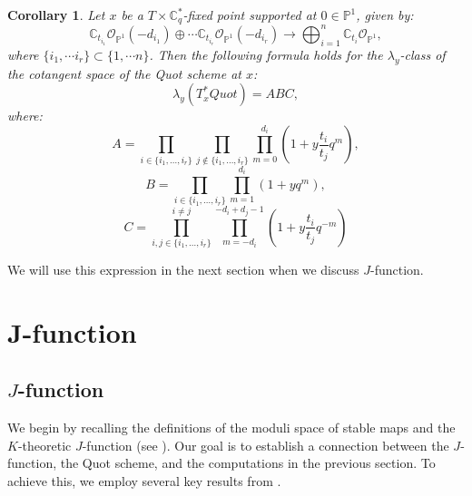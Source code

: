 \documentclass{amsart}
\newtheorem{Corollary}[thm]{Corollary}
\begin{document}
\begin{Corollary}\label{Corollary2.5}
    Let $x$ be a $T \times \mathbb{C}_q^*$-fixed point supported at $0 \in \mathbb{P}^1$, given by:
    \[
    \mathbb{C}_{t_{i_1}}\mathcal{O}_{\mathbb{P}^1}(-d_{i_1}) \oplus \cdots \mathbb{C}_{t_{i_r}}\mathcal{O}_{\mathbb{P}^1}(-d_{i_r}) \to \bigoplus_{i=1}^n \mathbb{C}_{t_i} \mathcal{O}_{\mathbb{P}^1},
    \] 
    where $\{i_1, \cdots i_r\} \subset  \{1, \cdots n\}$. Then the following formula holds for the $\lambda_y$-class of the cotangent space of the Quot scheme at $x$:
    \[
    \lambda_y(T_x^*Quot) = ABC,
    \]
    where:
    \[
    A = \prod_{i \in \{i_1,\dots,i_r\}} \prod_{j \notin \{i_1,\dots,i_r\}} \prod_{m=0}^{d_i}(1+y{\frac{t_i}{t_j}}q^{m}),
    \]
    \[
    B = \prod_{i \in \{i_1,\dots,i_r\}}\prod_{m=1}^{d_i}(1+yq^{m}),
    \]
    \[
    C = \prod_{i,j \in \{i_1,\dots,i_r\}}^{i \ne j}\prod_{m=-d_i}^{-d_i+d_j-1}(1+y{\frac{t_i}{t_j}}q^{-m})
    \]
\end{Corollary}
We will use this expression in the next section when we discuss $J$-function.
\section{J-function}\label{J-function section}
 \subsection{$J$-function}
 We begin by recalling the definitions of the moduli space of stable maps and the $K$-theoretic $J$-function (see \cite{Taipale}). Our goal is to establish a connection between the $J$-function, the Quot scheme, and the computations in the previous section. To achieve this, we employ several key results from \cite{Bertram:2003qd}.
\end{document}
